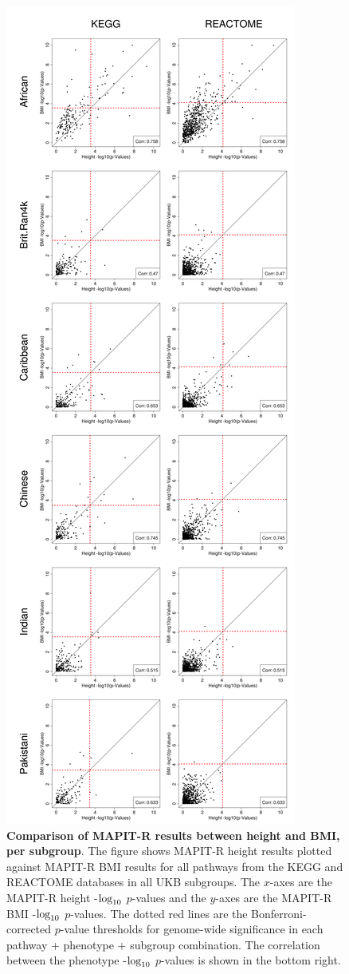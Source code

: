 \documentclass[12pt,a4paper]{article}
\def\log{{\rm log}}
\begin{document}
\setlength{\footskip}{3cm}
\begin{figure}[htbp]
\centering
\vspace*{-2cm}
\includegraphics[scale=.2]{Images/Supp/InterPath_Supp_Figure_MAPITR_PhenoComps_AllPops_vs4.png}
\caption[TBD]{\textbf{Comparison of MAPIT-R results between height and BMI, per subgroup}. The figure shows MAPIT-R height results plotted against MAPIT-R BMI results for all pathways from the KEGG and REACTOME databases in all UKB subgroups. The $x$-axes are the MAPIT-R height -$\log_{10}$ $p$-values and the $y$-axes are the MAPIT-R BMI -$\log_{10}$ $p$-values. The dotted red lines are the Bonferroni-corrected $p$-value thresholds for genome-wide significance in each pathway + phenotype + subgroup combination. The correlation between the phenotype -$\log_{10}$ $p$-values is shown in the bottom right.}
\label{InterPath-Supp-Figure-MAPITR-PhenoComps-AllPops}
\end{figure}
\end{document}
